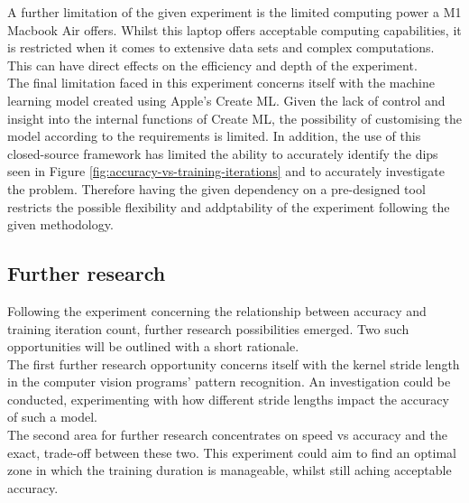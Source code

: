 A further limitation of the given experiment is the limited computing power a M1 Macbook Air offers. Whilst this laptop offers acceptable computing capabilities, it is restricted when it comes to extensive data sets and complex computations. This can have direct effects on the efficiency and depth of the experiment. \\

The final limitation faced in this experiment concerns itself with the machine learning model created using Apple's Create ML. 
Given the lack of control and insight into the internal functions of Create ML, the possibility of customising the model according to the
requirements is limited. In addition, the use of this closed-source framework has limited the ability to accurately identify the dips 
seen in Figure \ref{fig:accuracy-vs-training-iterations} and to accurately investigate the problem. 
Therefore having the given dependency on a pre-designed tool restricts the possible flexibility and addptability of the experiment following the given methodology.  \\

\newpage

\subsection{Further research}
Following the experiment concerning the relationship between accuracy and training iteration count, further research possibilities emerged. Two such opportunities will be outlined with a short rationale.  \\

The first further research opportunity concerns itself with the kernel stride length in the computer vision programs' pattern recognition. An investigation could be conducted, experimenting with how different stride lengths impact the accuracy of such a model.   \\

The second area for further research concentrates on speed vs accuracy and the exact, trade-off between these two. This experiment could aim to find an optimal zone in which the training duration is manageable, whilst still aching acceptable accuracy.   \\




